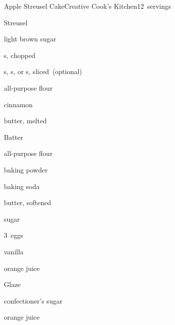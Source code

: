 \begin{recipe}{Apple Streusel Cake}{Creative Cook's Kitchen}{12~servings}

Streusel
\begin{ingredients}
\item {} light brown sugar
\item {} s, chopped
\item {} s, s, or s, sliced~(optional)
\item \C{\quarter} all-purpose flour
\item {} cinnamon
\item {} butter, melted
\end{ingredients}

Batter
\begin{ingredients}
\item {} all-purpose flour
\item {} baking powder
\item {} baking soda
\item \C{\half} butter, softened
\item \C{\half} sugar
\item 3~eggs
\item \tp{\half} vanilla
\item \C{\third} orange juice
\end{ingredients}

Glaze
\begin{ingredients}
\item \C{\half} confectioner's sugar
\item \tp{2\half} orange juice
\end{ingredients}


\end{recipe}
